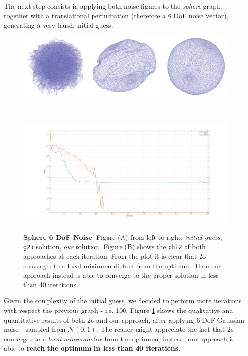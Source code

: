 The next step consists in applying both noise figures to the \textit{sphere} graph, together with a translational perturbation (therefore a 6 DoF noise vector), generating a very harsh initial guess.

\begin{figure}[!hbt]
    \centering    
    \begin{minipage}[t!]{0.9\textwidth}
        \centering
        \includegraphics[width=\textwidth]{figures/04_solvingSe3/viewer_sphere_awgn_SOLVED.png}
        \subcaption{} 
        \label{fig:sphere_awgn_solution}
    \end{minipage}\\
    \begin{minipage}[t!]{0.9\textwidth}
        \centering
        \includegraphics[width=\textwidth]{figures/04_solvingSe3/sphere_N0_1.pdf}
        \subcaption{}
        \label{fig:sphere_awgn_chi2}
    \end{minipage}%
    \caption{\textbf{Sphere 6 DoF Noise.} Figure (A) from left to right: \textit{initial guess}, \texttt{g2o} solution, \textit{our} solution. Figure (B) shows the \texttt{chi2} of both approaches at each iteration. From the plot it is clear that \g2o converges to a local minimum distant from the optimum. Here our approach instead is able to converge to the proper solution in less than 40 iterations.}
    \label{fig:sphere_awgn}
\end{figure}

\noindent Given the complexity of the initial guess, we decided to perform more iterations with respect the previous graph - i.e. 100. Figure \ref{fig:sphere_awgn} shows the qualitative and quantitative results of both \g2o and our approach, after applying 6 DoF Gaussian noise - sampled from $\mathcal{N}(0,1)$. The reader might appreciate the fact that \g2o converges to a \textit{local minimum} far from the optimum, instead, our approach is able to \textbf{reach the optimum in less than 40 iterations}.

